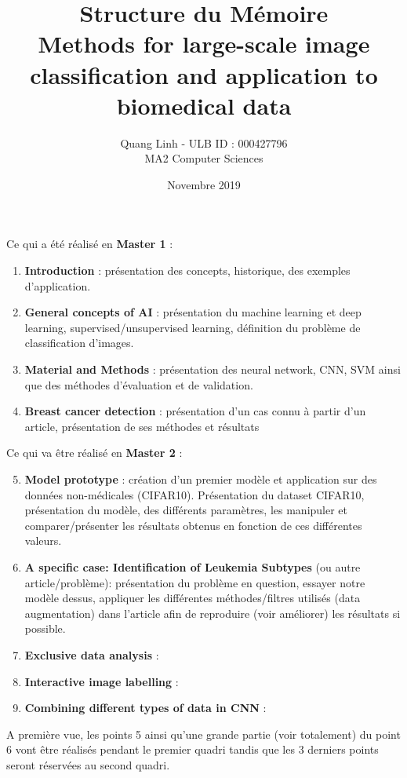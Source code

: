 \documentclass{article}
\title{Structure du Mémoire \\ Methods for large-scale image classification and application to biomedical data}
\author{\bsc{BUI QUANG PHUONG} Quang Linh - ULB ID : 000427796 \\ MA2 Computer Sciences}
\date{Novembre 2019}
\begin{document}
\maketitle

Ce qui a été réalisé en \textbf{Master 1} : 

\begin{enumerate}
\item \textbf{Introduction} : présentation des concepts, historique, des exemples d'application. 

\item \textbf{General concepts of AI} : présentation du machine learning et deep learning, supervised/unsupervised learning, définition du problème de classification d'images. 

\item \textbf{Material and Methods} : présentation des neural network, CNN, SVM ainsi que des méthodes d'évaluation et de validation. 

\item \textbf{Breast cancer detection} : présentation d'un cas connu à partir d'un article, présentation de ses méthodes et résultats 

\end{enumerate}

\noindent\hrulefill

\vspace{0.5cm}
Ce qui va être réalisé en \textbf{Master 2} :

\begin{enumerate}
\setcounter{enumi}{4}

\item \textbf{Model prototype} : création d'un premier modèle et application sur des données non-médicales (CIFAR10). Présentation du dataset CIFAR10, présentation du modèle, des différents paramètres, les manipuler et comparer/présenter les résultats obtenus en fonction de ces différentes valeurs. 

\item \textbf{A specific case: Identification of Leukemia Subtypes} (ou autre article/problème): présentation du problème en question, essayer notre modèle dessus, appliquer les différentes méthodes/filtres utilisés (data augmentation) dans l'article afin de reproduire (voir améliorer) les résultats si possible. 


\item \textbf{Exclusive data analysis} : 

\item \textbf{Interactive image labelling} : 

\item \textbf{Combining different types of data in CNN} : 

\end{enumerate}

A première vue, les points 5 ainsi qu'une grande partie (voir totalement) du point 6 vont être réalisés pendant le premier quadri tandis que les 3 derniers points seront réservées au second quadri. 
\end{document}
